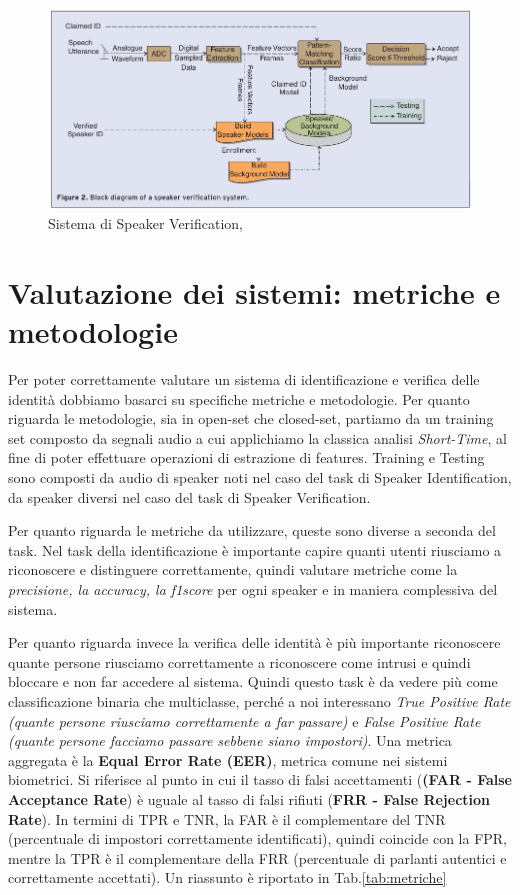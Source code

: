 \begin{figure}[ht]
    \centering
    \includegraphics[width=1.0\textwidth]{./ch1/speaker_ver.png}
    \caption{Sistema di Speaker Verification, \protect\cite{togneri2011overview}}
    \label{fig:speakerschemaver}
\end{figure}

\section{Valutazione dei sistemi: metriche e metodologie}
Per poter correttamente valutare un sistema di identificazione e verifica delle identità dobbiamo basarci su specifiche metriche e metodologie.
Per quanto riguarda le metodologie, sia in open-set che closed-set, partiamo da un training set composto da segnali audio a cui applichiamo la classica analisi \textit{Short-Time},
al fine di poter effettuare operazioni di estrazione di features. Training e Testing sono composti da audio di speaker noti nel caso del task di Speaker Identification, da speaker diversi nel caso del task di Speaker Verification.

Per quanto riguarda le metriche da utilizzare, queste sono diverse a seconda del task. Nel task della identificazione è importante capire quanti utenti riusciamo a riconoscere
e distinguere correttamente, quindi valutare metriche come la \textit{precisione, la accuracy, la f1score} per ogni speaker e in maniera complessiva del sistema. 

Per quanto riguarda invece la verifica delle identità è più importante riconoscere quante persone riusciamo correttamente a riconoscere come intrusi e quindi bloccare e non far accedere al sistema. 
Quindi questo task è da vedere più come classificazione binaria che multiclasse, perché a noi interessano \textit{True Positive Rate (quante persone riusciamo correttamente a far passare)} e \textit{False Positive Rate (quante persone facciamo passare sebbene siano impostori)}.
Una metrica aggregata è la \textbf{Equal Error Rate (EER)}, metrica comune nei sistemi biometrici. Si riferisce al punto in cui il tasso di falsi accettamenti (\textbf{(FAR - False Acceptance Rate}) è uguale al tasso di falsi rifiuti (\textbf{FRR - False Rejection Rate}). 
In termini di TPR e TNR, la FAR è il complementare del TNR (percentuale di impostori correttamente identificati), quindi coincide con la FPR, mentre la TPR è il complementare della FRR (percentuale di parlanti autentici e correttamente accettati).
Un riassunto è riportato in Tab.\ref{tab:metriche}

